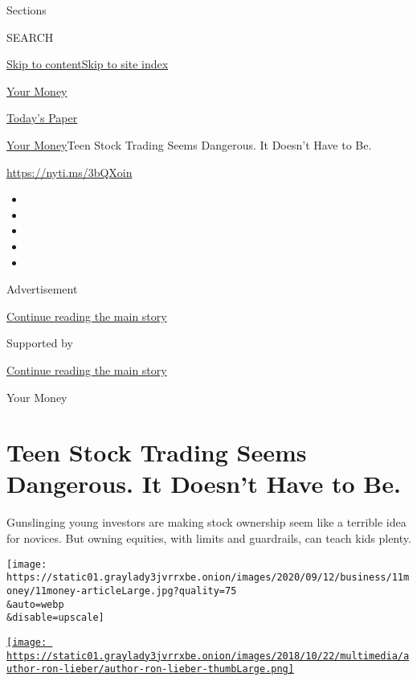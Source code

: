 Sections

SEARCH

\protect\hyperlink{site-content}{Skip to
content}\protect\hyperlink{site-index}{Skip to site index}

\href{https://www.nytimes3xbfgragh.onion/section/your-money}{Your Money}

\href{https://myaccount.nytimes3xbfgragh.onion/auth/login?response_type=cookie\&client_id=vi}{}

\href{https://www.nytimes3xbfgragh.onion/section/todayspaper}{Today's
Paper}

\href{/section/your-money}{Your Money}\textbar{}Teen Stock Trading Seems
Dangerous. It Doesn't Have to Be.

\url{https://nyti.ms/3bQXoin}

\begin{itemize}
\item
\item
\item
\item
\item
\end{itemize}

Advertisement

\protect\hyperlink{after-top}{Continue reading the main story}

Supported by

\protect\hyperlink{after-sponsor}{Continue reading the main story}

Your Money

\hypertarget{teen-stock-trading-seems-dangerous-it-doesnt-have-to-be}{%
\section{Teen Stock Trading Seems Dangerous. It Doesn't Have to
Be.}\label{teen-stock-trading-seems-dangerous-it-doesnt-have-to-be}}

Gunslinging young investors are making stock ownership seem like a
terrible idea for novices. But owning equities, with limits and
guardrails, can teach kids plenty.

\texttt{[image: https://static01.graylady3jvrrxbe.onion/images/2020/09/12/business/11money/11money-articleLarge.jpg?quality=75\\\&auto=webp\\\&disable=upscale]}

\href{https://www.nytimes3xbfgragh.onion/by/ron-lieber}{\texttt{[image: https://static01.graylady3jvrrxbe.onion/images/2018/10/22/multimedia/author-ron-lieber/author-ron-lieber-thumbLarge.png]}}

